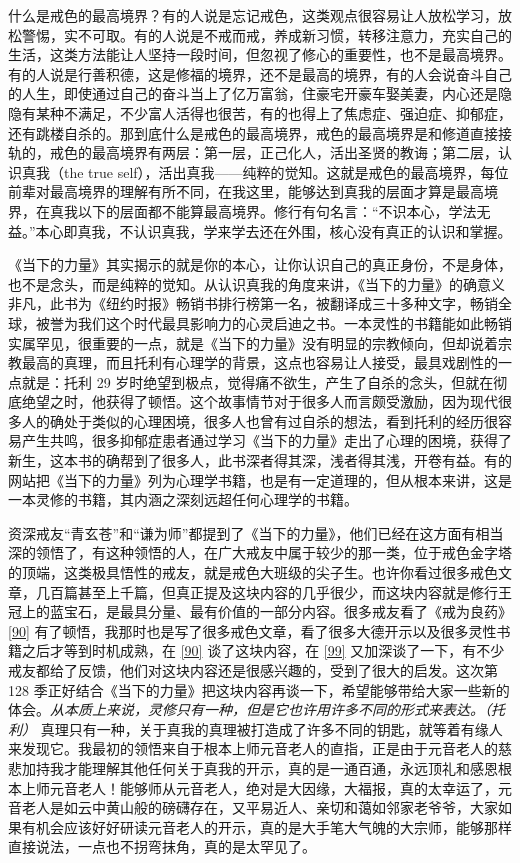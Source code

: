 什么是戒色的最高境界？有的人说是忘记戒色，这类观点很容易让人放松学习，放松警惕，实不可取。有的人说是不戒而戒，养成新习惯，转移注意力，充实自己的生活，这类方法能让人坚持一段时间，但忽视了修心的重要性，也不是最高境界。有的人说是行善积德，这是修福的境界，还不是最高的境界，有的人会说奋斗自己的人生，即使通过自己的奋斗当上了亿万富翁，住豪宅开豪车娶美妻，内心还是隐隐有某种不满足，不少富人活得也很苦，有的也得上了焦虑症、强迫症、抑郁症，还有跳楼自杀的。那到底什么是戒色的最高境界，戒色的最高境界是和修道直接接轨的，戒色的最高境界有两层：第一层，正己化人，活出圣贤的教诲；第二层，认识真我（the true self），活出真我——纯粹的觉知。这就是戒色的最高境界，每位前辈对最高境界的理解有所不同，在我这里，能够达到真我的层面才算是最高境界，在真我以下的层面都不能算最高境界。修行有句名言：“不识本心，学法无益。”本心即真我，不认识真我，学来学去还在外围，核心没有真正的认识和掌握。

《当下的力量》其实揭示的就是你的本心，让你认识自己的真正身份，不是身体，也不是念头，而是纯粹的觉知。从认识真我的角度来讲，《当下的力量》的确意义非凡，此书为《纽约时报》畅销书排行榜第一名，被翻译成三十多种文字，畅销全球，被誉为我们这个时代最具影响力的心灵启迪之书。一本灵性的书籍能如此畅销实属罕见，很重要的一点，就是《当下的力量》没有明显的宗教倾向，但却说着宗教最高的真理，而且托利有心理学的背景，这点也容易让人接受，最具戏剧性的一点就是：托利 29 岁时绝望到极点，觉得痛不欲生，产生了自杀的念头，但就在彻底绝望之时，他获得了顿悟。这个故事情节对于很多人而言颇受激励，因为现代很多人的确处于类似的心理困境，很多人也曾有过自杀的想法，看到托利的经历很容易产生共鸣，很多抑郁症患者通过学习《当下的力量》走出了心理的困境，获得了新生，这本书的确帮到了很多人，此书深者得其深，浅者得其浅，开卷有益。有的网站把《当下的力量》列为心理学书籍，也是有一定道理的，但从根本来讲，这是一本灵修的书籍，其内涵之深刻远超任何心理学的书籍。

资深戒友“青玄苍”和“谦为师”都提到了《当下的力量》，他们已经在这方面有相当深的领悟了，有这种领悟的人，在广大戒友中属于较少的那一类，位于戒色金字塔的顶端，这类极具悟性的戒友，就是戒色大班级的尖子生。也许你看过很多戒色文章，几百篇甚至上千篇，但真正提及这块内容的几乎很少，而这块内容就是修行王冠上的蓝宝石，是最具分量、最有价值的一部分内容。很多戒友看了《戒为良药》\ref{90} 有了顿悟，我那时也是写了很多戒色文章，看了很多大德开示以及很多灵性书籍之后才等到时机成熟，在 \ref{90} 谈了这块内容，在 \ref{99} 又加深谈了一下，有不少戒友都给了反馈，他们对这块内容还是很感兴趣的，受到了很大的启发。这次第 128 季正好结合《当下的力量》把这块内容再谈一下，希望能够带给大家一些新的体会。\textit{从本质上来说，灵修只有一种，但是它也许用许多不同的形式来表达。（托利）} 真理只有一种，关于真我的真理被打造成了许多不同的钥匙，就等着有缘人来发现它。我最初的领悟来自于根本上师元音老人的直指，正是由于元音老人的慈悲加持我才能理解其他任何关于真我的开示，真的是一通百通，永远顶礼和感恩根本上师元音老人！能够师从元音老人，绝对是大因缘，大福报，真的太幸运了，元音老人是如云中黄山般的磅礴存在，又平易近人、亲切和蔼如邻家老爷爷，大家如果有机会应该好好研读元音老人的开示，真的是大手笔大气魄的大宗师，能够那样直接说法，一点也不拐弯抹角，真的是太罕见了。

